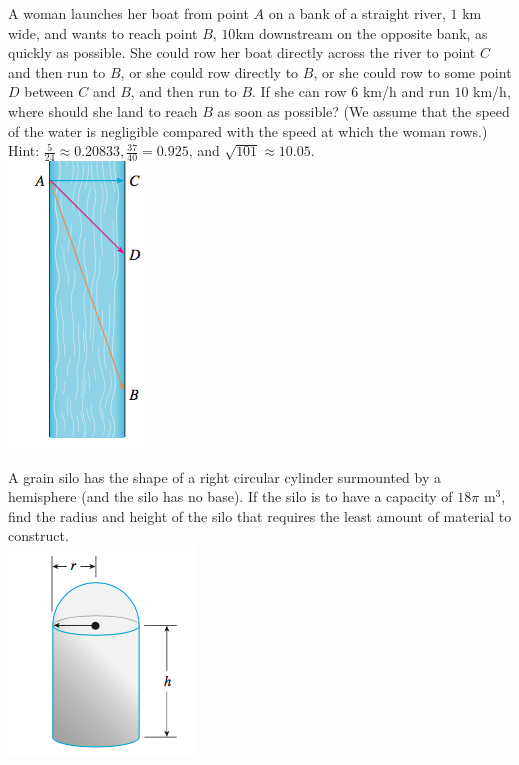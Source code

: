 \documentclass[12pt, a4paper]{article}
\begin{document}
\begin{ex}
  A woman launches her boat from point \(A\) on a bank of a straight
  river, \(1\) km wide, and wants to reach point \(B\), \(10\)km
  downstream on the opposite bank, as quickly as possible. She could
  row her boat directly across the river to point \(C\) and then run
  to \(B\), or she could row directly to \(B\), or she could row to
  some point \(D\) between \(C\) and \(B\), and then run to \(B\). If
  she can row \(6\) km/h and run \(10\) km/h, where should she land to
  reach \(B\) as soon as possible? (We assume that the speed of the
  water is negligible compared with the speed at which the woman
  rows.) Hint: \(\frac{5}{24} \approx 0.20833, \frac{37}{40} =
  0.925\), and \(\sqrt{101} \approx 10.05\). \\
\includegraphics[scale=0.5]{images/river}
\end{ex}
\vspace{-1.5in}
\begin{ex}
  A grain silo has the shape of a right circular cylinder surmounted
  by a hemisphere (and the silo has no base). If the silo is to have a capacity of \(18 \pi
  \text{ m}^3\), find the radius and height of the silo that requires
  the least amount of material to construct.\\
  \includegraphics[scale=0.6]{images/silo}
\end{ex}
\end{document}
